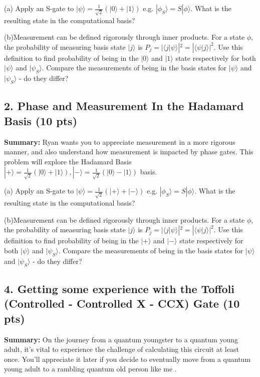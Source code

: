 \documentclass[12pt]{article}
\newcommand{\ket}[1]{| #1 \rangle}
\begin{document}
(a) Apply an S-gate to $\ket{\psi} = \frac{1}{\sqrt{2}}( \ket{0} + \ket{1})$ e.g. $\ket{\phi_S} = S \ket{\phi}$. What is the resulting state in the computational basis?

(b)Measurement can be defined rigorously through inner products. For a state $\phi$, the probability of measuring basis state $\ket{j}$ is $P_j = |\langle j | \psi \rangle|^2 =   |\langle \psi | j \rangle|^2$. Use this definition to find probability of being in the $\ket{0}$ and $\ket{1}$ state respectively for both $\ket{\psi}$ and $\ket{\psi_S}$. Compare the measurements of being in the basis states for $\ket{\psi}$ and $\ket{\psi_S}$ - do they differ?

\subsection*{2. Phase and Measurement In the Hadamard Basis (10 pts)}

\textbf{Summary:} Ryan wants you to appreciate measurement in a more rigorous manner, and also understand how measurement is impacted by phase gates. This problem will explore the Hadamard Basis $\ket{+} = \frac{1}{\sqrt{2}} ( \ket{0} + \ket{1}) , \ket{-} =  \frac{1}{\sqrt{2}} ( \ket{0} - \ket{1}) $ basis.

(a) Apply an S-gate to $\ket{\psi} = \frac{1}{\sqrt{2}}( \ket{+} + \ket{-})$ e.g. $\ket{\phi_S} = S \ket{\phi}$. What is the resulting state in the computational basis?

(b)Measurement can be defined rigorously through inner products. For a state $\phi$, the probability of measuring basis state $\ket{j}$ is $P_j = |\langle j | \psi \rangle|^2 =   |\langle \psi | j \rangle|^2$. Use this definition to find probability of being in the $\ket{+}$ and $\ket{-}$ state respectively for both $\ket{\psi}$ and $\ket{\psi_S}$. Compare the measurements of being in the basis states for $\ket{\psi}$ and $\ket{\psi_S}$ - do they differ?

\subsection*{4. Getting some experience with the Toffoli (Controlled - Controlled X  - CCX) Gate (10 pts)}

\textbf{Summary:} On the journey from a quantum youngster to a quantum young adult, it’s vital to experience the challenge of calculating this circuit at least once. You’ll appreciate it later if you decide to eventually move from a quantum young adult to a rambling quantum old person like me \smiley{}.
\end{document}
